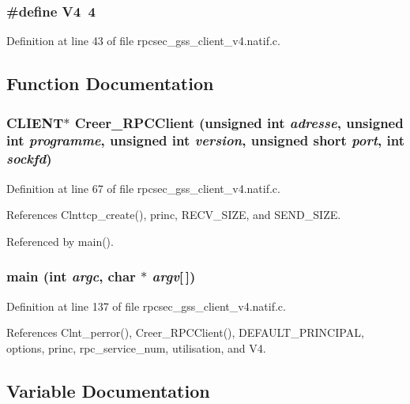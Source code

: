 \subsubsection{\setlength{\rightskip}{0pt plus 5cm}\#define V4\ 4}\label{rpcsec__gss__client__v4_8natif_8c_a5}




Definition at line 43 of file rpcsec\_\-gss\_\-client\_\-v4.natif.c.

\subsection{Function Documentation}
\subsubsection{\setlength{\rightskip}{0pt plus 5cm}CLIENT$\ast$ Creer\_\-RPCClient (unsigned int {\em adresse}, unsigned int {\em programme}, unsigned int {\em version}, unsigned short {\em port}, int {\em sockfd})}\label{rpcsec__gss__client__v4_8natif_8c_a15}




Definition at line 67 of file rpcsec\_\-gss\_\-client\_\-v4.natif.c.

References Clnttcp\_\-create(), princ, RECV\_\-SIZE, and SEND\_\-SIZE.

Referenced by main().
\subsubsection{\setlength{\rightskip}{0pt plus 5cm}main (int {\em argc}, char $\ast$ {\em argv}[$\,$])}\label{rpcsec__gss__client__v4_8natif_8c_a16}




Definition at line 137 of file rpcsec\_\-gss\_\-client\_\-v4.natif.c.

References Clnt\_\-perror(), Creer\_\-RPCClient(), DEFAULT\_\-PRINCIPAL, options, princ, rpc\_\-service\_\-num, utilisation, and V4.

\subsection{Variable Documentation}

